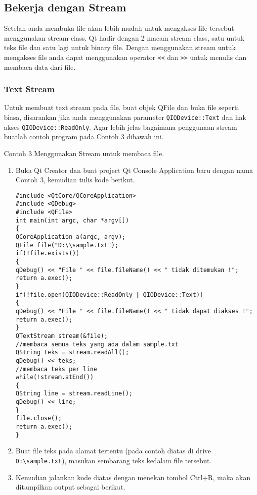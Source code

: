 \subsection{Bekerja dengan Stream}\label{bekerja-dengan-stream}

Setelah anda membuka file akan lebih mudah untuk mengakses file tersebut
menggunakan stream class. Qt hadir dengan 2 macam stream class, satu
untuk teks file dan satu lagi untuk binary file. Dengan menggunakan
stream untuk mengakses file anda dapat menggunakan operator
\texttt{\textless{}\textless{}} dan
\texttt{\textgreater{}\textgreater{}} untuk menulis dan membaca data
dari file.

\subsubsection{Text Stream}\label{text-stream}

Untuk membuat text stream pada file, buat objek QFile dan buka file
seperti biasa, disarankan jika anda menggunakan parameter
\texttt{QIODevice::Text} dan hak akses \texttt{QIODevice::ReadOnly}.
Agar lebih jelas bagaimana penggunaan stream buatlah contoh program pada
Contoh 3 dibawah ini.

Contoh 3 Menggunakan Stream untuk membaca file.

\begin{enumerate}
\def\labelenumi{\arabic{enumi}.}
\item
  Buka Qt Creator dan buat project Qt Console Application baru dengan
  nama Contoh 3, kemudian tulis kode berikut.

\begin{verbatim}
#include <QtCore/QCoreApplication>
#include <QDebug>
#include <QFile>
int main(int argc, char *argv[])
{
QCoreApplication a(argc, argv);
QFile file("D:\\sample.txt");
if(!file.exists())
{
qDebug() << "File " << file.fileName() << " tidak ditemukan !";
return a.exec();
}
if(!file.open(QIODevice::ReadOnly | QIODevice::Text))
{
qDebug() << "File " << file.fileName() << " tidak dapat diakses !";
return a.exec();
}
QTextStream stream(&file);
//membaca semua teks yang ada dalam sample.txt
QString teks = stream.readAll();
qDebug() << teks;
//membaca teks per line
while(!stream.atEnd())
{
QString line = stream.readLine();
qDebug() << line;
}
file.close();
return a.exec();
}
\end{verbatim}
\item
  Buat file teks pada alamat tertentu (pada contoh diatas di drive
  \texttt{D:\textbackslash{}sample.txt}), masukan sembarang teks kedalam
  file tersebut.
\item
  Kemudian jalankan kode diatas dengan menekan tombol Ctrl+R, maka akan
  ditampilkan output sebagai berikut.
\end{enumerate}


